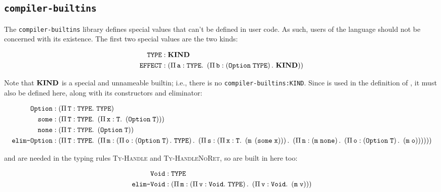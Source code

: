 \subsection{\texttt{compiler-builtins}}

The \texttt{compiler-builtins} library defines special values that can't be defined in user code.
As such, users of the language should not be concerned with its existence.
The first two special values are the two kinds:

\begin{align}
	\texttt{TYPE} & : \mathbf{KIND} \\
	\texttt{EFFECT} & : \left(\Pi\,\mathit{\texttt{a}}:\texttt{TYPE}.\ \left(\Pi\,\mathit{\texttt{b}}:\left(\texttt{Option}\;\texttt{TYPE}\right).\ \mathbf{KIND}\right)\right)
\end{align}

Note that $\mathbf{KIND}$ is a special and unnameable builtin; i.e., there is no \texttt{compiler-builtins:KIND}.
Since  is used in the definition of , it must also be defined here, along with its constructors and eliminator:

\begin{align}
	\texttt{Option} & : \left(\Pi\,\mathit{\texttt{T}}:\texttt{TYPE}.\ \texttt{TYPE}\right) \\
	\texttt{some} & : \left(\Pi\,\mathit{\texttt{T}}:\texttt{TYPE}.\ \left(\Pi\,\mathit{\texttt{x}}:\texttt{T}.\ \left(\texttt{Option}\;\texttt{T}\right)\right)\right) \\
	\texttt{none} & : \left(\Pi\,\mathit{\texttt{T}}:\texttt{TYPE}.\ \left(\texttt{Option}\;\texttt{T}\right)\right) \\
	\texttt{elim-Option} & : \left(\Pi\,\mathit{\texttt{T}}:\texttt{TYPE}.\ \left(\Pi\,\mathit{\texttt{m}}:\left(\Pi\,\mathit{\texttt{o}}:\left(\texttt{Option}\;\texttt{T}\right).\ \texttt{TYPE}\right).\ \left(\Pi\,\mathit{\texttt{s}}:\left(\Pi\,\mathit{\texttt{x}}:\texttt{T}.\ \left(\texttt{m}\;\left(\texttt{some}\;\texttt{x}\right)\right)\right).\ \left(\Pi\,\mathit{\texttt{n}}:\left(\texttt{m}\;\texttt{none}\right).\ \left(\Pi\,\mathit{\texttt{o}}:\left(\texttt{Option}\;\texttt{T}\right).\ \left(\texttt{m}\;\texttt{o}\right)\right)\right)\right)\right)\right)
\end{align}

 and  are needed in the typing rules \textsc{Ty-Handle} and \textsc{Ty-HandleNoRet}, so are built in here too:

\begin{align}
	\texttt{Void} & : \texttt{TYPE} \\
	\texttt{elim-Void} & : \left(\Pi\,\mathit{\texttt{m}}:\left(\Pi\,\mathit{\texttt{v}}:\texttt{Void}.\ \texttt{TYPE}\right).\ \left(\Pi\,\mathit{\texttt{v}}:\texttt{Void}.\ \left(\texttt{m}\;\texttt{v}\right)\right)\right)
\end{align}


